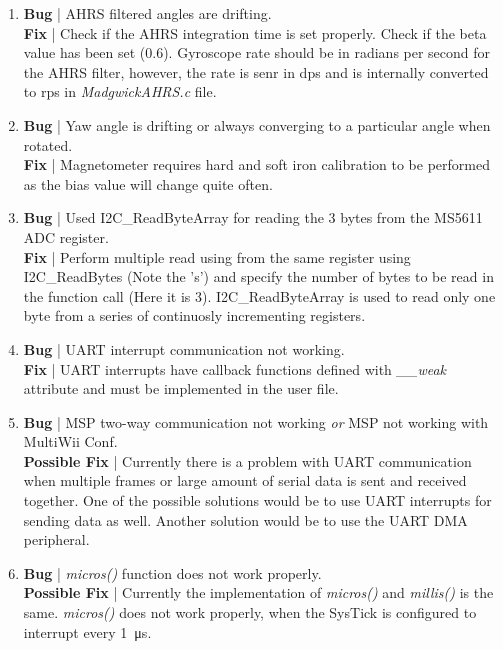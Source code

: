 \documentclass[a4paper,12pt,oneside]{book}
\begin{document}
{\begin{enumerate}
\clearpage

\item \textbf{Bug} | AHRS filtered angles are drifting.\\
\textbf{Fix} | Check if the AHRS integration time is set properly. Check if the beta value has been set (0.6). Gyroscope rate should be in radians per second for the AHRS filter, however, the rate is senr in dps and is internally converted to rps in \textit{MadgwickAHRS.c} file.\\

\item \textbf{Bug} | Yaw angle is drifting or always converging to a particular angle when rotated.\\
\textbf{Fix} | Magnetometer requires hard and soft iron calibration to be performed as the bias value will change quite often.\\

\item \textbf{Bug} | Used I2C{\_}ReadByteArray for reading the 3 bytes from the MS5611 ADC register.\\
\textbf{Fix} | Perform multiple read using from the same register using I2C{\_}ReadBytes (Note the 's') and specify the number of bytes to be read in the function call (Here it is 3). I2C{\_}ReadByteArray is used to read only one byte from a series of continuosly incrementing registers.\\

\item \textbf{Bug} | UART interrupt communication not working.\\
\textbf{Fix} | UART interrupts have callback functions defined with \textit{{\_\_}weak} attribute and must be implemented in the user file.\\

\item \textbf{Bug} | MSP two-way communication not working \textit{or} MSP not working with MultiWii Conf.\\
\textbf{Possible Fix} | Currently there is a problem with UART communication when multiple frames or large amount of serial data is sent and received together. One of the possible solutions would be to use UART interrupts for sending data as well. Another solution would be to use the UART DMA peripheral.\\

\item \textbf{Bug} | \textit{micros()} function does not work properly.\\
\textbf{Possible Fix} | Currently the implementation of \textit{micros()} and \textit{millis()} is the same. \textit{micros()} does not work properly, when the SysTick is configured to interrupt every \SI{1}{\micro\second}.\\


\end{enumerate}}
\end{document}
